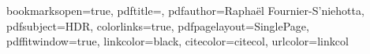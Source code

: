 
 \hypersetup
 {
 bookmarksopen=true,
 pdftitle=,
 pdfauthor=Raphaël Fournier-S'niehotta, %
 pdfsubject=HDR, %
 colorlinks=true, %
 pdfpagelayout=SinglePage, %
 pdffitwindow=true, %
 linkcolor=black, %
 citecolor=citecol, %
 urlcolor=linkcol %
 }




\setlength{\parskip}{1ex plus 1ex minus 1ex}


\setlength{\cftsecindent}{1.2cm}

\newenvironment{dedication}
  {%
   \thispagestyle{empty}%
   \vspace*{\stretch{1}}%
   \itshape             %
   \raggedleft          %
  }
  {\par %
   \vspace{\stretch{3}} %
   \clearpage           %
  }


